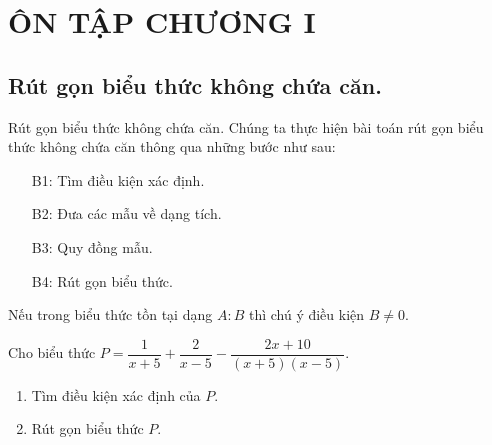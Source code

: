 \section{ÔN TẬP CHƯƠNG I}
\subsection{Rút gọn biểu thức không chứa căn.}
\begin{dang}{Rút gọn biểu thức không chứa căn.}
    Chúng ta thực hiện bài toán rút gọn biểu thức không chứa căn thông qua những bước như sau:
    \begin{enumerate}
    \item[B1:] Tìm điều kiện xác định.
    \item[B2:] Đưa các mẫu về dạng tích.
    \item[B3:] Quy đồng mẫu.
    \item[B4:] Rút gọn biểu thức.
	\end{enumerate}
    \begin{note}
        Nếu trong biểu thức tồn tại dạng $A:B$ thì chú ý điều kiện $B\neq 0$.
    \end{note}
\end{dang}
\begin{vd}
    Cho biểu thức $P=\dfrac{1}{x+5}+\dfrac{2}{x-5}-\dfrac{2x+10}{(x+5)(x-5)}$.\\
    \begin{enumerate}
    	\item Tìm điều kiện xác định của $P$.
    	\item Rút gọn biểu thức $P$.
    \end{enumerate}
\end{vd}
